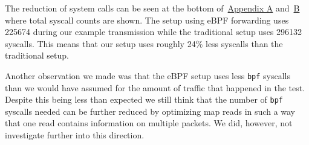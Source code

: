 The reduction of system calls can be seen at the bottom of~\hyperref[chap:appendix-fast-relay]{Appendix A} 
and~\hyperref[chap:appendix-plain-relay]{B} where total syscall counts are shown.
The setup using eBPF forwarding uses 225674 during our example transmission while the traditional setup 
uses 296132 syscalls.
This means that our setup uses roughly 24\% less syscalls than the traditional setup.

Another observation we made was that the eBPF setup uses less \verb|bpf| syscalls than we would have assumed for 
the amount of traffic that happened in the test.
Despite this being less than expected we still think that the number of \verb|bpf| syscalls needed can be 
further reduced by optimizing map reads in such a way that one read contains information on multiple packets.
We did, however, not investigate further into this direction.